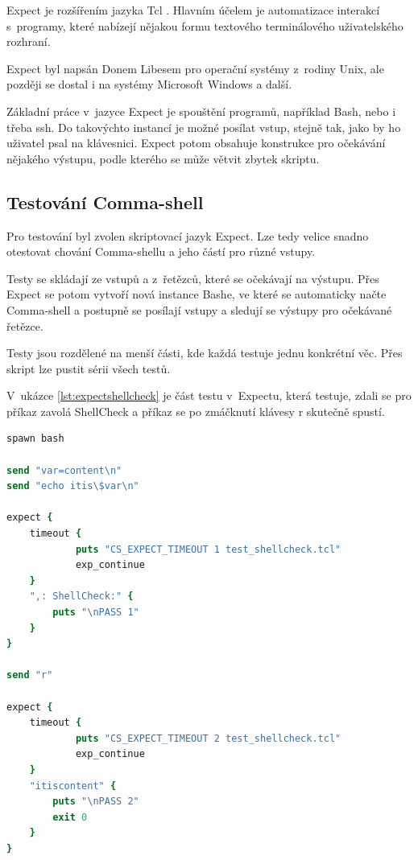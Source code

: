 \documentclass[thesis=M,czech]{FITthesis}[2012/06/26]
\begin{document}
Expect \cite{expect} je rozšířením jazyka Tcl \cite{tcl}. Hlavním účelem je automatizace interakcí s~programy, které nabízejí nějakou formu textového terminálového uživatelského rozhraní.

Expect byl napsán Donem Libesem pro operační systémy z~rodiny Unix, ale později se dostal i na systémy Microsoft Windows a další.

Základní práce v~jazyce Expect je spouštění programů, například Bash, nebo i třeba ssh. Do takovýchto instancí je možné posílat vstup, stejně tak, jako by ho uživatel psal na klávesnici. Expect potom obsahuje konstrukce pro očekávání nějakého výstupu, podle kterého se může větvit zbytek skriptu.



\subsection{Testování Comma-shell}

Pro testování byl zvolen skriptovací jazyk Expect. Lze tedy velice snadno otestovat chování Comma-shellu a jeho částí pro různé vstupy.

Testy se skládají ze vstupů a z~řetězců, které se očekávají na výstupu. Přes Expect se potom vytvoří nová instance Bashe, ve které se automaticky načte Comma-shell a postupně se posílají vstupy a sledují se výstupy pro očekávané řetězce.

Testy jsou rozdělené na menší části, kde každá testuje jednu konkrétní věc. Přes skript lze pustit sérii všech testů.

V~ukázce \ref{lst:expectshellcheck} je část testu v~Expectu, která testuje, zdali se pro příkaz zavolá ShellCheck a příkaz se po zmáčknutí klávesy r skutečně spustí.


\begin{minipage}{\linewidth}
\begin{lstlisting}[language=tcl, caption={Expect test}, label={lst:expectshellcheck}]
spawn bash

send "var=content\n"
send "echo itis\$var\n"

expect {
	timeout {
			puts "CS_EXPECT_TIMEOUT 1 test_shellcheck.tcl"
			exp_continue
	}
	",: ShellCheck:" {
		puts "\nPASS 1"
	}
}

send "r"

expect {
	timeout {
			puts "CS_EXPECT_TIMEOUT 2 test_shellcheck.tcl"
			exp_continue
	}
	"itiscontent" {
		puts "\nPASS 2"
		exit 0
	}
}
\end{lstlisting}
\end{minipage}
\end{document}
